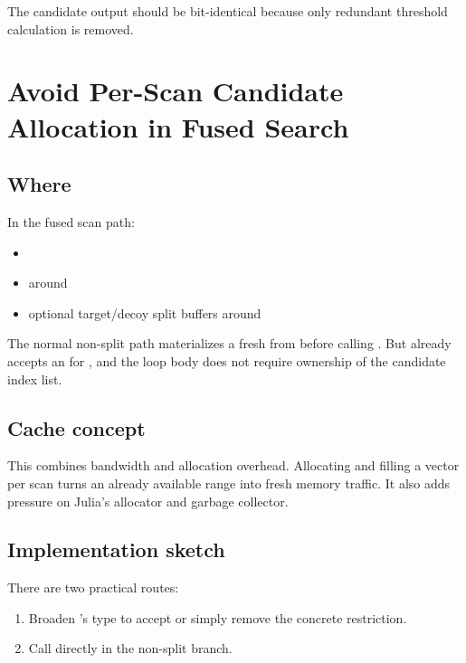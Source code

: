 \documentclass[11pt]{article}
\begin{document}
The candidate output should be bit-identical because only redundant threshold
calculation is removed.

\section{Avoid Per-Scan Candidate Allocation in Fused Search}

\subsection*{Where}

In the fused scan path:

\begin{itemize}
  \item {}
  \item {} around 
  \item optional target/decoy split buffers around 
\end{itemize}

The normal non-split path materializes a fresh  from
 before calling . But  already
accepts an  for , and the loop body
does not require ownership of the candidate index list.

\subsection*{Cache concept}

This combines bandwidth and allocation overhead. Allocating and filling a vector
per scan turns an already available range into fresh memory traffic. It also adds
pressure on Julia's allocator and garbage collector.

\subsection*{Implementation sketch}

There are two practical routes:

\begin{enumerate}
  \item Broaden 's  type to accept
         or simply remove the concrete
         restriction.
  \item Call  directly in the non-split branch.
\end{enumerate}
\end{document}

